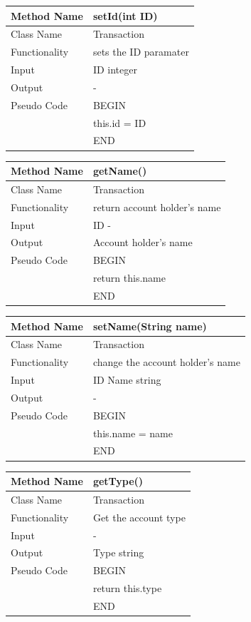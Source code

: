 \documentclass[12pt]{article}
\begin{document}
\begin{tabular}{ |p{3cm}||p{\colWidth}|  }
	\hline
	Method Name &  setId(int ID) \\
	\hline
	Class Name & Transaction\\
	\hline
	Functionality & sets the ID paramater\\
	\hline
	Input & ID integer\\
	\hline
	Output & -\\
	\hline
	Pseudo Code & BEGIN \\
	& this.id = ID\\
	&END\\
	\hline
\end{tabular}



\begin{tabular}{ |p{3cm}||p{\colWidth}|  }
	\hline
	Method Name &  getName() \\
	\hline
	Class Name & Transaction\\
	\hline
	Functionality & return account holder's name\\
	\hline
	Input & ID -\\
	\hline
	Output & Account holder's name\\
	\hline
	Pseudo Code& BEGIN \\ & return this.name\\
	&END\\
	\hline
\end{tabular}



\begin{tabular}{ |p{3cm}||p{\colWidth}|  }
	\hline
	Method Name &  setName(String name) \\
	\hline
	Class Name & Transaction\\
	\hline
	Functionality &  change the account holder's name\\
	\hline
	Input & ID Name string\\
	\hline
	Output & -\\
	\hline
	Pseudo Code& BEGIN \\ & this.name = name\\ & END\\
	\hline
\end{tabular}



\begin{tabular}{ |p{3cm}||p{\colWidth}|  }
	\hline
	Method Name &  getType() \\
	\hline
	Class Name & Transaction\\
	\hline
	Functionality &  Get the account type\\
	\hline
	Input & -\\
	\hline
	Output & Type string\\
	\hline
	Pseudo Code& BEGIN \\ & return this.type \\ & END\\
	\hline
\end{tabular}
\end{document}
